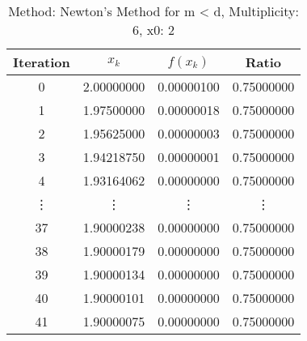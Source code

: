 \begin{table}
\centering
\caption{Method: Newton's Method for m < d, Multiplicity: 6, x0: 2}
\label{tab:table_Newton's_Method_for_m_<_d_6_2}
\begin{tabular}{c c c c}
\toprule
Iteration &      $x_k$ &   $f(x_k)$ &      Ratio \\
\midrule
        0 & 2.00000000 & 0.00000100 & 0.75000000 \\
        1 & 1.97500000 & 0.00000018 & 0.75000000 \\
        2 & 1.95625000 & 0.00000003 & 0.75000000 \\
        3 & 1.94218750 & 0.00000001 & 0.75000000 \\
        4 & 1.93164062 & 0.00000000 & 0.75000000 \\
   \vdots &     \vdots &     \vdots &     \vdots \\
       37 & 1.90000238 & 0.00000000 & 0.75000000 \\
       38 & 1.90000179 & 0.00000000 & 0.75000000 \\
       39 & 1.90000134 & 0.00000000 & 0.75000000 \\
       40 & 1.90000101 & 0.00000000 & 0.75000000 \\
       41 & 1.90000075 & 0.00000000 & 0.75000000 \\
\bottomrule
\end{tabular}
\end{table}
